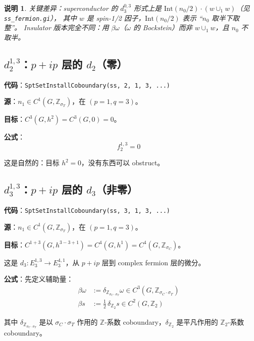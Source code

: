 \documentclass[a4paper,fontset=ubuntu,12pt]{ctexart}
\newtheorem{remark}[definition]{说明}
\newcommand{\ZZ}{\mathbb{Z}}
\newcommand{\aT}{\sigma_T}
\newcommand{\aC}{\sigma_C}
\begin{document}
\begin{remark}
关键差异：superconductor 的 $d_3^{0,3}$ 形式上是 $\mathrm{Int}(n_0/2) \cdot (w \cup_1 w)$（见 \texttt{ss\_fermion.gi}），
其中 $w$ 是 spin-1/2 因子，$\mathrm{Int}(n_0/2)$ 表示 ``$n_0$ 取半下取整''。
Insulator 版本完全不同：用 $\beta\omega$（$\omega$ 的 Bockstein）而非 $w \cup_1 w$，且 $n_0$ 不取半。
\end{remark}

\subsection{\texorpdfstring{$d_2^{1,3}$}{d2(1,3)}：$p+ip$ 层的 $d_2$（零）}
\label{sec:d2-13}

\textbf{代码}：\texttt{SptSetInstallCoboundary(ss, 2, 1, 3, ...)}

\textbf{源}：$n_1 \in C^1(G, \ZZ_{\aT})$，在 $(p = 1, q = 3)$。

\textbf{目标}：$C^3(G, h^2) = C^3(G, 0) = 0$。

\textbf{公式}：
\begin{equation}
\label{eq:d2-13}
f_2^{1,3} = 0
\end{equation}

这是自然的：目标 $h^2 = 0$，没有东西可以 obstruct。

\subsection{\texorpdfstring{$d_3^{1,3}$}{d3(1,3)}：$p+ip$ 层的 $d_3$（非零）}
\label{sec:d3-13}

\textbf{代码}：\texttt{SptSetInstallCoboundary(ss, 3, 1, 3, ...)}

\textbf{源}：$n_1 \in C^1(G, \ZZ_{\aT})$，在 $(p = 1, q = 3)$。

\textbf{目标}：$C^{1+3}(G, h^{3-3+1}) = C^4(G, h^1) = C^4(G, \ZZ_{\aC})$。

这是 $d_3: E_3^{1,3} \to E_3^{4,1}$，从 $p+ip$ 层到 complex fermion 层的微分。

\textbf{公式}：先定义辅助量：
\begin{align}
\beta\omega &:= \delta_{\ZZ_{\aC \cdot \aT}} \omega \in C^3(G, \ZZ_{\aC \cdot \aT})
\label{eq:beta-omega} \\
\beta s &:= \tfrac{1}{2}\, \delta_{\ZZ_2} s \in C^2(G, \ZZ_2)
\label{eq:beta-s}
\end{align}

其中 $\delta_{\ZZ_{\aC \cdot \aT}}$ 是以 $\aC \cdot \aT$ 作用的 $\ZZ$-系数 coboundary，$\delta_{\ZZ_2}$ 是平凡作用的 $\ZZ_2$-系数 coboundary。
\end{document}
